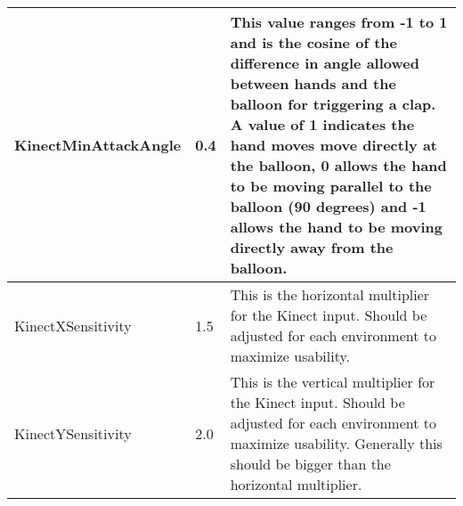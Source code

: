 \begin{tabular}{|>{\raggedright}p{5cm}|>{\raggedright}p{3.6cm}|>{\raggedright}p{7cm}|}
KinectMinAttackAngle & 0.4 & This value ranges from -1 to 1 and is the cosine of the difference in angle allowed between hands and the balloon for triggering a clap. A value of 1 indicates the hand moves move directly at the balloon, 0 allows the hand to be moving parallel to the balloon (90 degrees) and -1 allows the hand to be moving directly away from the balloon.
\tabularnewline\hline

KinectXSensitivity & 1.5 & This is the horizontal multiplier for the Kinect input. Should be adjusted for each environment to maximize usability.
\tabularnewline\hline

KinectYSensitivity & 2.0 & This is the vertical multiplier for the Kinect input. Should be adjusted for each environment to maximize usability. Generally this should be bigger than the horizontal multiplier.
\tabularnewline\hline



\end{tabular}
